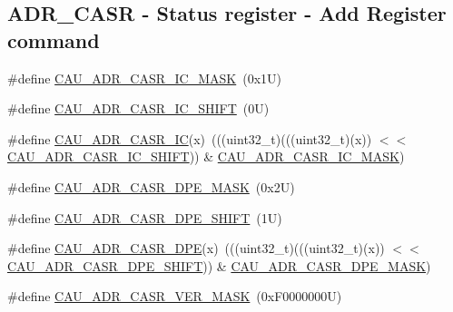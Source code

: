\subsection*{A\+D\+R\+\_\+\+C\+A\+SR -\/ Status register -\/ Add Register command}
\begin{DoxyCompactItemize}
\item 
\#define \mbox{\hyperlink{group___c_a_u___register___masks_ga5c604aca577b3d7a07e03e6b98ae418f}{C\+A\+U\+\_\+\+A\+D\+R\+\_\+\+C\+A\+S\+R\+\_\+\+I\+C\+\_\+\+M\+A\+SK}}~(0x1\+U)
\item 
\#define \mbox{\hyperlink{group___c_a_u___register___masks_ga0659a788cbcc596dc60f7d85104ade27}{C\+A\+U\+\_\+\+A\+D\+R\+\_\+\+C\+A\+S\+R\+\_\+\+I\+C\+\_\+\+S\+H\+I\+FT}}~(0\+U)
\item 
\#define \mbox{\hyperlink{group___c_a_u___register___masks_ga22d32967d0cf360e55db925e8255587a}{C\+A\+U\+\_\+\+A\+D\+R\+\_\+\+C\+A\+S\+R\+\_\+\+IC}}(x)~(((uint32\+\_\+t)(((uint32\+\_\+t)(x)) $<$$<$ \mbox{\hyperlink{group___c_a_u___register___masks_ga0659a788cbcc596dc60f7d85104ade27}{C\+A\+U\+\_\+\+A\+D\+R\+\_\+\+C\+A\+S\+R\+\_\+\+I\+C\+\_\+\+S\+H\+I\+FT}})) \& \mbox{\hyperlink{group___c_a_u___register___masks_ga5c604aca577b3d7a07e03e6b98ae418f}{C\+A\+U\+\_\+\+A\+D\+R\+\_\+\+C\+A\+S\+R\+\_\+\+I\+C\+\_\+\+M\+A\+SK}})
\item 
\#define \mbox{\hyperlink{group___c_a_u___register___masks_gac2aa12b2fd1060e7b5c444cb64efbcf6}{C\+A\+U\+\_\+\+A\+D\+R\+\_\+\+C\+A\+S\+R\+\_\+\+D\+P\+E\+\_\+\+M\+A\+SK}}~(0x2\+U)
\item 
\#define \mbox{\hyperlink{group___c_a_u___register___masks_gac342820577edd24d5b9b2ffe7279c18a}{C\+A\+U\+\_\+\+A\+D\+R\+\_\+\+C\+A\+S\+R\+\_\+\+D\+P\+E\+\_\+\+S\+H\+I\+FT}}~(1\+U)
\item 
\#define \mbox{\hyperlink{group___c_a_u___register___masks_ga55ef695f8d261c0ef2d77dac688d31db}{C\+A\+U\+\_\+\+A\+D\+R\+\_\+\+C\+A\+S\+R\+\_\+\+D\+PE}}(x)~(((uint32\+\_\+t)(((uint32\+\_\+t)(x)) $<$$<$ \mbox{\hyperlink{group___c_a_u___register___masks_gac342820577edd24d5b9b2ffe7279c18a}{C\+A\+U\+\_\+\+A\+D\+R\+\_\+\+C\+A\+S\+R\+\_\+\+D\+P\+E\+\_\+\+S\+H\+I\+FT}})) \& \mbox{\hyperlink{group___c_a_u___register___masks_gac2aa12b2fd1060e7b5c444cb64efbcf6}{C\+A\+U\+\_\+\+A\+D\+R\+\_\+\+C\+A\+S\+R\+\_\+\+D\+P\+E\+\_\+\+M\+A\+SK}})
\item 
\#define \mbox{\hyperlink{group___c_a_u___register___masks_gabb62168b08dff77e1dd30ca4cb6cd997}{C\+A\+U\+\_\+\+A\+D\+R\+\_\+\+C\+A\+S\+R\+\_\+\+V\+E\+R\+\_\+\+M\+A\+SK}}~(0x\+F0000000\+U)
\item 

\end{DoxyCompactItemize}
